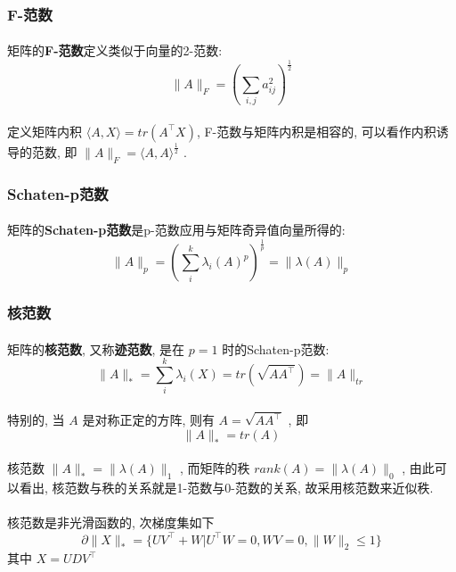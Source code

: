 \documentclass[UTF8]{ctexart}
\renewcommand{\b}{\textbf}
\newcommand{\equ}[1]{\begin{equation}#1\end{equation}}
\newcommand{\norm}[1]{\lVert#1\rVert}
\newcommand{\inprod}[1]{\langle#1\rangle}
\newcommand{\nunorm}{\norm{X}_*}
\numberwithin{equation}{section}
\begin{document}
			\subsubsection{F-范数}
				\paragraph{}
					\quad 矩阵的\b{F-范数}定义类似于向量的2-范数:
					\[
						\norm{A}_F = (\sum_{i, j} a_{ij}^2)^{\frac{1}{2}}
					\]
				\paragraph{}
					\quad 定义矩阵内积 $\inprod{A, X} = tr(A^\top X)$, F-范数与矩阵内积是相容的, 可以看作内积诱导的范数, 即 $\norm{A}_F = \inprod{A, A}^{\frac{1}{2}}$ .

			\subsubsection{Schaten-p范数}
				\paragraph{}
					\quad 矩阵的\b{Schaten-p范数}是p-范数应用与矩阵奇异值向量所得的:
					\[
							\norm{A}_p
						=	(\sum_i^k \lambda_i(A)^p)^{\frac{1}{p}}
						=	\norm{\lambda(A)}_p
					\]
			
			\subsubsection{核范数}
				\paragraph{}
					\quad 矩阵的\b{核范数}, 又称\b{迹范数}, 是在 $p = 1$ 时的Schaten-p范数:
					\[
							\norm{A}_*
						=	\sum_i^k \lambda_i(X)
						=	tr(\sqrt{A A^\top})
						=	\norm{A}_{tr}
					\]

				\paragraph{}
					\quad 特别的, 当 $A$ 是对称正定的方阵, 则有 $ A = \sqrt{A A^\top}$ , 即
					\[
						\norm{A}_* = tr(A)
					\]

				\paragraph{}
					\quad 核范数 $\norm{A}_* = \norm{\lambda(A)}_1$ , 而矩阵的秩 $rank(A) = \norm{\lambda(A)}_0$ , 由此可以看出, 核范数与秩的关系就是1-范数与0-范数的关系, 故采用核范数来近似秩.

				\paragraph{}
					\quad 核范数是非光滑函数的, 次梯度集如下
					\equ{\label{NuNormSubGrad}
							\partial \nunorm
						=	\{U V^\top + W \vert U^\top W = 0,WV = 0, \norm{W}_2 \leq 1\}
					}
					其中 $X = U D V^\top$
\end{document}
